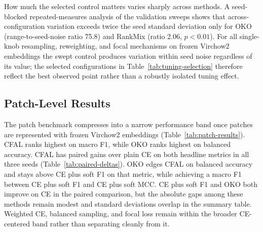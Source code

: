 \documentclass[11pt]{article}
\begin{document}
\begin{table}[htbp]
  \centering
  \footnotesize
  \setlength{\tabcolsep}{3.5pt}
  \renewcommand{\arraystretch}{1.12}
  \caption{Validation-selected configuration provenance. Configurations are chosen by mean validation macro F1 over seeds 0--2; held-out test metrics in Tables~\ref{tab:patch-results} and~\ref{tab:wsi-results} are reported after selection.}
  \label{tab:tuning-selection}
\end{table}

\noindent How much the selected control matters varies sharply across methods. A seed-blocked repeated-measures analysis of the validation sweeps shows that across-configuration variation exceeds twice the seed standard deviation only for OKO (range-to-seed-noise ratio \num{75.8}) and RankMix (ratio \num{2.06}, $p<\num{0.01}$). For all single-knob resampling, reweighting, and focal mechanisms on frozen Virchow2 embeddings the swept control produces variation within seed noise regardless of its value; the selected configurations in Table~\ref{tab:tuning-selection} therefore reflect the best observed point rather than a robustly isolated tuning effect.

\subsection{Patch-Level Results}
\begin{table}[ht]
  \centering
  \small
  
  \caption{Validation-selected patch-level test results over three seeds. Methods share the same controlled manifest, frozen Virchow2 encoder, shared MLP trunk, and evaluation code.}
  \label{tab:patch-results}
\end{table}

The patch benchmark compresses into a narrow performance band once patches are represented with frozen Virchow2 embeddings (Table~\ref{tab:patch-results}). CFAL ranks highest on macro F1, while OKO ranks highest on balanced accuracy. CFAL has paired gains over plain CE on both headline metrics in all three seeds (Table~\ref{tab:paired-deltas}). OKO edges CFAL on balanced accuracy and stays above CE plus soft F1 on that metric, while achieving a macro F1 between CE plus soft F1 and CE plus soft MCC. CE plus soft F1 and OKO both improve on CE in the paired comparison, but the absolute gaps among these methods remain modest and standard deviations overlap in the summary table. Weighted CE, balanced sampling, and focal loss remain within the broader CE-centered band rather than separating cleanly from it.
\end{document}
